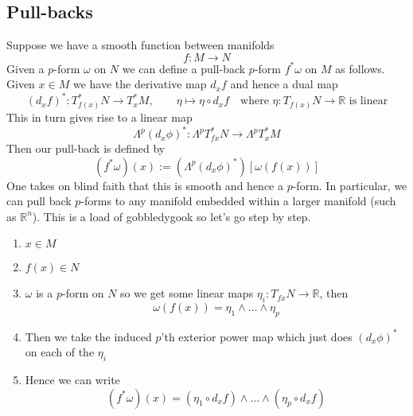 \documentclass[11pt]{article}
\newcommand{\defeq}{:=}
\newcommand{\Lp}{\Lambda^p}
\newcommand{\R}{\mathbb{R}}
\newcommand{\mdf}[1]{{\color{RoyalBlue} #1}}
\begin{document}
\subsection{Pull-backs}
Suppose we have a smooth function between manifolds
\[
f:M \to N
\]
Given a $p$-form $\omega$ on $N$ we can define a \mdf{pull-back $p$-form $f^\ast\omega$} on $M$ as follows. 
Given $x\in M$ we have the derivative map $d_xf$ and hence a dual map
\[
	(d_x f)^\ast : T^\ast_{f(x)}N \to T^\ast_x M , \quad \quad \eta \mapsto \eta \circ d_xf \quad \text{where }\eta:T_{f(x)}N \to \R\text{ is linear}
\]
This in turn gives rise to a linear map
\[
	\Lp(d_x\phi)^\ast : \Lambda^pT_{fx}^\ast N \to \Lp T_x^\ast M
\]
Then our pull-back is defined by
\[
	(f^\ast\omega)(x) \defeq (\Lp(d_x\phi)^\ast)\left[\omega(f(x))\right]
\]
One takes on blind faith that this is smooth and hence a $p$-form.
In particular, we can pull back $p$-forms to any manifold embedded within a larger manifold (such as $\R^n$).
This is a load of gobbledygook so let's go step by step.
\begin{enumerate}
	\item $x\in M$
	\item $f(x)\in N$
	\item $\omega$ is a $p$-form on $N$ so we get some linear maps $\eta_i:T_{fx}N\to\R$, then
		\[
			\omega(f(x))=\eta_1 \wedge \dots \wedge \eta_p
		\]
	\item Then we take the induced $p$'th exterior power map which just does $(d_x\phi)^\ast$ on each of the $\eta_i$
	\item Hence we can write
		\[
			(f^\ast\omega)(x) = (\eta_1 \circ d_xf) \wedge \dots \wedge (\eta_p \circ d_xf)
		\]
\end{enumerate}
\end{document}
